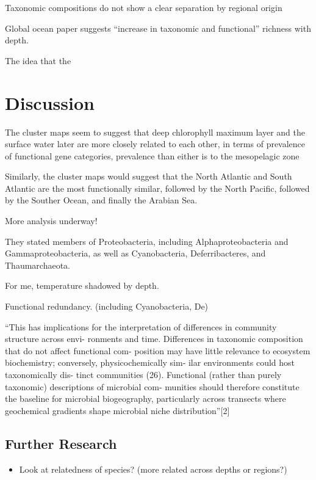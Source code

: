 \documentclass[12pt,a4paper,]{article}
\providecommand{\tightlist}{%
  \setlength{\itemsep}{0pt}\setlength{\parskip}{0pt}}
\begin{document}
Taxonomic compositions do not show a clear separation by regional origin

Global ocean paper suggests ``increase in taxonomic and functional''
richness with depth.

The idea that the

\section{Discussion}\label{discussion}

The cluster maps seem to suggest that deep chlorophyll maximum layer and
the surface water later are more closely related to each other, in terms
of prevalence of functional gene categories, prevalence than either is
to the mesopelagic zone

Similarly, the cluster maps would suggest that the North Atlantic and
South Atlantic are the most functionally similar, followed by the North
Pacific, followed by the Souther Ocean, and finally the Arabian Sea.

More analysis underway!

They stated members of Proteobacteria, including Alphaproteobacteria and
Gammaproteobacteria, as well as Cyanobacteria, Deferribacteres, and
Thaumarchaeota.

For me, temperature shadowed by depth.

Functional redundancy. (including Cyanobacteria, De)

``This has implications for the interpretation of differences in
community structure across envi- ronments and time. Differences in
taxonomic composition that do not affect functional com- position may
have little relevance to ecosystem biochemistry; conversely,
physicochemically sim- ilar environments could host taxonomically dis-
tinct communities (26). Functional (rather than purely taxonomic)
descriptions of microbial com- munities should therefore constitute the
baseline for microbial biogeography, particularly across transects where
geochemical gradients shape microbial niche distribution''{[}2{]}

\subsection{Further Research}\label{further-research}

\begin{itemize}
\tightlist
\item
  Look at relatedness of species? (more related across depths or
  regions?)
\end{itemize}
\end{document}
